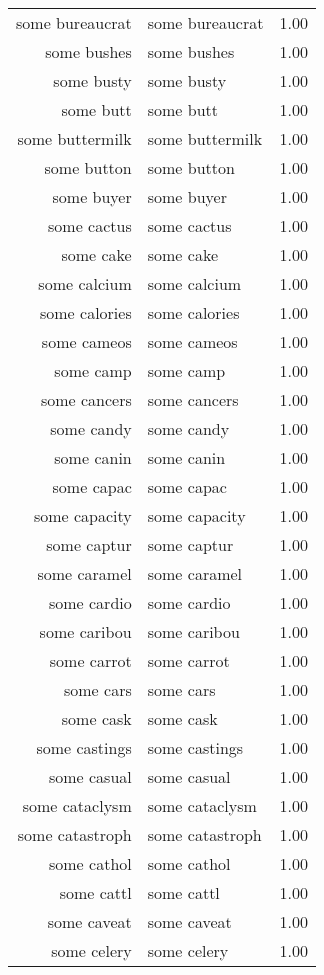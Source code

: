\begin{table}[ht]
\begin{tabular}{rlr}
  some bureaucrat & some bureaucrat & 1.00 \\ 
  some bushes & some bushes & 1.00 \\ 
  some busty & some busty & 1.00 \\ 
  some butt & some butt & 1.00 \\ 
  some buttermilk & some buttermilk & 1.00 \\ 
  some button & some button & 1.00 \\ 
  some buyer & some buyer & 1.00 \\ 
  some cactus & some cactus & 1.00 \\ 
  some cake & some cake & 1.00 \\ 
  some calcium & some calcium & 1.00 \\ 
  some calories & some calories & 1.00 \\ 
  some cameos & some cameos & 1.00 \\ 
  some camp & some camp & 1.00 \\ 
  some cancers & some cancers & 1.00 \\ 
  some candy & some candy & 1.00 \\ 
  some canin & some canin & 1.00 \\ 
  some capac & some capac & 1.00 \\ 
  some capacity & some capacity & 1.00 \\ 
  some captur & some captur & 1.00 \\ 
  some caramel & some caramel & 1.00 \\ 
  some cardio & some cardio & 1.00 \\ 
  some caribou & some caribou & 1.00 \\ 
  some carrot & some carrot & 1.00 \\ 
  some cars & some cars & 1.00 \\ 
  some cask & some cask & 1.00 \\ 
  some castings & some castings & 1.00 \\ 
  some casual & some casual & 1.00 \\ 
  some cataclysm & some cataclysm & 1.00 \\ 
  some catastroph & some catastroph & 1.00 \\ 
  some cathol & some cathol & 1.00 \\ 
  some cattl & some cattl & 1.00 \\ 
  some caveat & some caveat & 1.00 \\ 
  some celery & some celery & 1.00 \\ 

\end{tabular}
\end{table}
